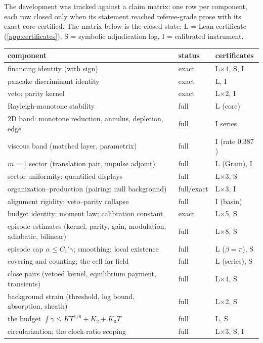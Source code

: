 \documentclass[11pt,letterpaper]{amsart}
\theoremstyle{definition}
\theoremstyle{remark}
\begin{document}
The development was tracked against a claim matrix: one row per component, each row
closed only when its statement reached referee-grade prose with its exact core
certified. The matrix below is the closed state; L = Lean certificate
(\cref{app:certificates}), S = symbolic adjudication log, I = calibrated instrument.

{\small
\setlength\LTleft{0pt}\setlength{}
\begin{longtable}{@{}>{\raggedright\arraybackslash}p{}ll@{}}
\toprule
component & status & certificates \\
\midrule
\endhead
financing identity (with sign) & exact & L$\times$4, S, I \\
pancake discriminant identity & exact & L, I \\
veto; parity kernel & exact & L$\times$2, I \\
Rayleigh-monotone stability & full & L (core) \\
2D band: monotone reduction, annulus, depletion, edge & full & I series \\
viscous band (matched layer, parametrix) & full & I (rate $0.387$) \\
$m=1$ sector (translation pair, impulse adjoint) & full & L (Gram), I \\
sector uniformity; quantified displays & full & L$\times$3, S \\
organization--production (pairing; null background) & full/exact & L$\times$3, I \\
alignment rigidity; veto--parity collapse & full & I (basin) \\
budget identity; moment law; calibration constant & exact & L$\times$5, S \\
episode estimates (kernel, parity, gain, modulation, adiabatic, bilinear) & full & L$\times$8, S \\
episode cap $\alpha\le C_1'\gamma$; smoothing; local existence & full & L ($\beta=\pi$), S \\
covering and counting; the cell far field & full & L (series), S \\
close pairs (vetoed kernel, equilibrium payment, transients) & full & L$\times$4, S \\
background strain (threshold, log bound, absorption, sheath) & full & L$\times$2, S \\
the budget $\int\gamma\le KT^{1/6}+K_2+K_3T$ & full & L, S \\
circularization; the clock-ratio scoping & full & L$\times$3, S, I \\

\end{longtable}}
\end{document}
